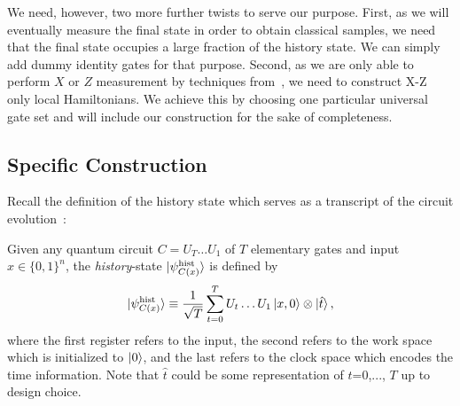 We need, however, two more further twists to serve our purpose. 
First, as we will eventually measure the final state in order to obtain classical samples, we need that the final state occupies a large fraction of the history state. We can simply add dummy identity gates for that purpose. 
Second, as we are only able to perform $X$ or $Z$ measurement by techniques from~\cite{FOCS:Mahadev18a},
we need to construct X-Z only local Hamiltonians. 
We achieve this by choosing one particular universal gate set and will include our construction for the sake of completeness. 






\subsection{Specific Construction}

Recall the definition of the history state which serves as a transcript of the circuit evolution~\cite{kitaev2002classical}:

\begin{dfn}
	\label{dfn:groundstate}	
    Given any quantum circuit $C=U_T\ldots U_1$ of $T$ elementary gates and input $x\in\{0,1\}^n$, the \emph{history}-state $\ket{\psi_{C(x)}^{\mathrm{hist}}}$ is defined by
    \begin{equation}
        \ket{\psi_{C(x)}^{\mathrm{hist}}} \equiv \frac{1}{\sqrt{T}}\sum_{t=0}^TU_t\ldots U_1\ket{x,0}\otimes\ket{\hat{t}},
    \end{equation}
    where the first register refers to the input, the second refers to the work space which is initialized to $\ket{0}$, and the last refers to the clock space which encodes the time information. Note that $\hat{t}$ could be some representation of $t$=0,..., $T$ up to design choice. 
\end{dfn}

